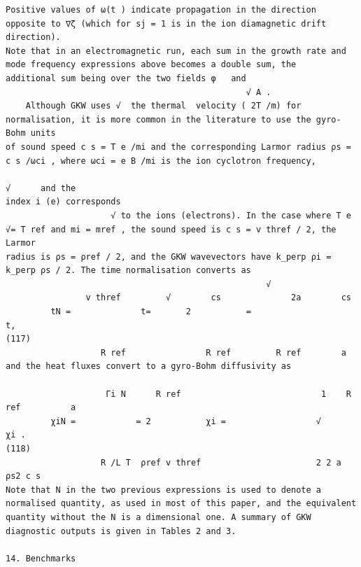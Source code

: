 \documentclass[a4paper]{article}
\newcommand{\gkwpagefont}{\fontsize{6.0pt}{7.55pt}\selectfont}
\begin{document}
\begin{Verbatim}[fontsize=\gkwpagefont]
Positive values of ω(t ) indicate propagation in the direction opposite to ∇ζ (which for sj = 1 is in the ion diamagnetic drift direction).
Note that in an electromagnetic run, each sum in the growth rate and mode frequency expressions above becomes a double sum, the
additional sum being over the two fields φ   and 
                                                √ A .
    Although GKW uses √  the thermal  velocity ( 2T /m) for normalisation, it is more common in the literature to use the gyro-Bohm units
of sound speed c s = T e /mi and the corresponding Larmor radius ρs = c s /ωci , where ωci = e B /mi is the ion cyclotron frequency,
                                                                                                                                 √      and the
index i (e) corresponds
                     √ to the ions (electrons). In the case where T e √= T ref and mi = mref , the sound speed is c s = v thref / 2, the Larmor
radius is ρs = ρref / 2, and the GKW wavevectors have k_perp ρi = k_perp ρs / 2. The time normalisation converts as
                                                    √                
                v thref         √        cs              2a        cs
         tN =              t=       2           =                       t,                                                                                                (117)
                   R ref                R ref         R ref        a
and the heat fluxes convert to a gyro-Bohm diffusivity as
                                                                                        
                    Γi N      R ref                            1    R ref          a
         χiN =            = 2           χi =                  √                            χi .                                                                           (118)
                   R /L T  ρref v thref                       2 2 a              ρs2 c s
Note that N in the two previous expressions is used to denote a normalised quantity, as used in most of this paper, and the equivalent
quantity without the N is a dimensional one. A summary of GKW diagnostic outputs is given in Tables 2 and 3.

14. Benchmarks


\end{Verbatim}
\end{document}
